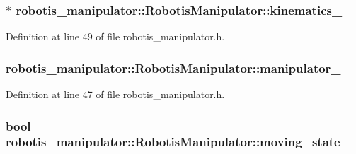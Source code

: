 \subsubsection[{\texorpdfstring{kinematics\+\_\+}{kinematics_}}]{$\ast$ robotis\+\_\+manipulator\+::\+Robotis\+Manipulator\+::kinematics\+\_\+\hspace{0.3cm}{\ttfamily [private]}}\hypertarget{classrobotis__manipulator_1_1_robotis_manipulator_a9a37fd068504dfe5fab346884790fc8f}{}\label{classrobotis__manipulator_1_1_robotis_manipulator_a9a37fd068504dfe5fab346884790fc8f}


Definition at line 49 of file robotis\+\_\+manipulator.\+h.

\subsubsection[{\texorpdfstring{manipulator\+\_\+}{manipulator_}}]{ robotis\+\_\+manipulator\+::\+Robotis\+Manipulator\+::manipulator\+\_\+\hspace{0.3cm}{\ttfamily [private]}}\hypertarget{classrobotis__manipulator_1_1_robotis_manipulator_a5b2df4a3b3ee7f408cb1d0eaf61644dc}{}\label{classrobotis__manipulator_1_1_robotis_manipulator_a5b2df4a3b3ee7f408cb1d0eaf61644dc}


Definition at line 47 of file robotis\+\_\+manipulator.\+h.

\subsubsection[{\texorpdfstring{moving\+\_\+state\+\_\+}{moving_state_}}]{\setlength{\rightskip}{0pt plus 5cm}bool robotis\+\_\+manipulator\+::\+Robotis\+Manipulator\+::moving\+\_\+state\+\_\+\hspace{0.3cm}{\ttfamily [private]}}\hypertarget{classrobotis__manipulator_1_1_robotis_manipulator_a5b7990548dd779b1ca66a2ad83a74f76}{}\label{classrobotis__manipulator_1_1_robotis_manipulator_a5b7990548dd779b1ca66a2ad83a74f76}


